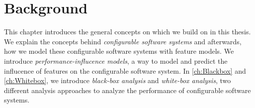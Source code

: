 \chapter{Background}\label{ch:background}
This chapter introduces the general concepts on which we build on in this thesis.
We explain the concepts behind \emph{configurable software systems} and afterwards, how we model these configurable software systems with
feature models.           %
We introduce \emph{performance-influcence models}, a way to model and predict the influcence of features on the configurable software system.
In \autoref{ch:Blackbox} and \autoref{ch:Whitebox}, we introduce \emph{black-box analysis} and \emph{white-box analysis}, 
two different analysis approaches to analyze the performance of configurable software systems.






